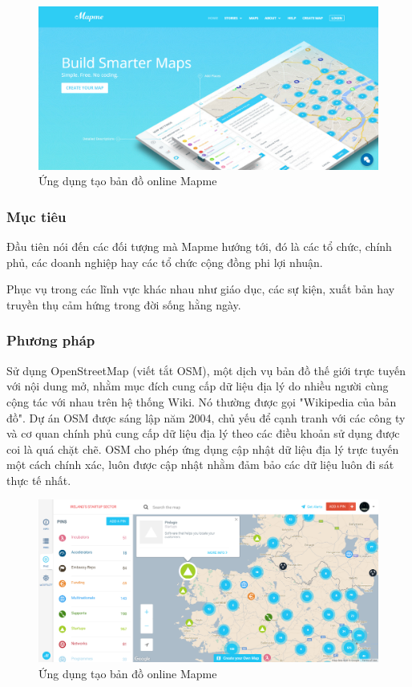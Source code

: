 \documentclass[12pt,a4paper]{article}
\begin{document}
\begin{figure}[htp]
	\begin{center}
    \includegraphics[scale=.4]{image/mapme}
    \caption{Ứng dụng tạo bản đồ online Mapme}
    \label{refhinh10}
    \end{center}
\end{figure}

\subsubsection{Mục tiêu}
Đầu tiên nói đến các đối tượng mà Mapme hướng tới, đó là các tổ chức, chính phủ, các doanh nghiệp hay các tổ chức cộng đồng phi lợi nhuận.

Phục vụ trong các lĩnh vực khác nhau như giáo dục, các sự kiện, xuất bản hay truyền thụ cảm hứng trong đời sống hằng ngày.

\subsubsection{Phương pháp}
Sử dụng OpenStreetMap (viết tắt OSM)\cite{osm}, một dịch vụ bản đồ thế giới trực tuyến với nội dung mở, nhằm mục đích cung cấp dữ liệu địa lý do nhiều người cùng cộng tác với nhau trên hệ thống Wiki. Nó thường được gọi "Wikipedia của bản đồ". Dự án OSM được sáng lập năm 2004, chủ yếu để cạnh tranh với các công ty và cơ quan chính phủ cung cấp dữ liệu địa lý theo các điều khoản sử dụng được coi là quá chặt chẽ. OSM cho phép ứng dụng cập nhật dữ liệu địa lý trực tuyến một cách chính xác, luôn được cập nhật nhằm đảm bảo các dữ liệu luôn đi sát thực tế nhất.

\begin{figure}[htp]
	\begin{center}
    \includegraphics[scale=.4]{image/mapmeOSM}
    \caption{Ứng dụng tạo bản đồ online Mapme}
    \label{refhinh11}
	\end{center}
\end{figure}
\end{document}
